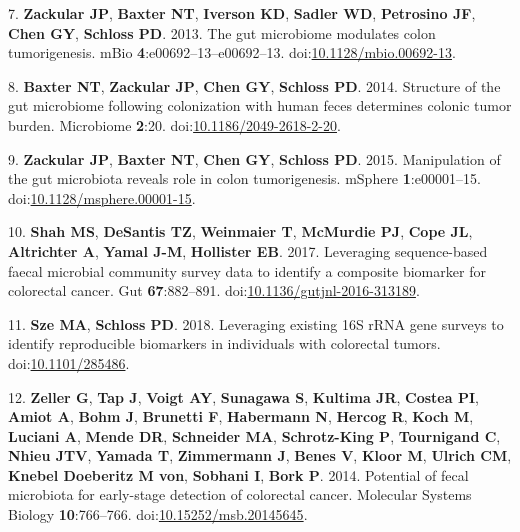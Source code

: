 \documentclass[11pt,]{article}
\begin{document}
\hypertarget{ref-Zackular2013}{}
7. \textbf{Zackular JP}, \textbf{Baxter NT}, \textbf{Iverson KD},
\textbf{Sadler WD}, \textbf{Petrosino JF}, \textbf{Chen GY},
\textbf{Schloss PD}. 2013. The gut microbiome modulates colon
tumorigenesis. mBio \textbf{4}:e00692--13--e00692--13.
doi:\href{https://doi.org/10.1128/mbio.00692-13}{10.1128/mbio.00692-13}.

\hypertarget{ref-Baxter2014}{}
8. \textbf{Baxter NT}, \textbf{Zackular JP}, \textbf{Chen GY},
\textbf{Schloss PD}. 2014. Structure of the gut microbiome following
colonization with human feces determines colonic tumor burden.
Microbiome \textbf{2}:20.
doi:\href{https://doi.org/10.1186/2049-2618-2-20}{10.1186/2049-2618-2-20}.

\hypertarget{ref-Zackular2015}{}
9. \textbf{Zackular JP}, \textbf{Baxter NT}, \textbf{Chen GY},
\textbf{Schloss PD}. 2015. Manipulation of the gut microbiota reveals
role in colon tumorigenesis. mSphere \textbf{1}:e00001--15.
doi:\href{https://doi.org/10.1128/msphere.00001-15}{10.1128/msphere.00001-15}.

\hypertarget{ref-Shah2017}{}
10. \textbf{Shah MS}, \textbf{DeSantis TZ}, \textbf{Weinmaier T},
\textbf{McMurdie PJ}, \textbf{Cope JL}, \textbf{Altrichter A},
\textbf{Yamal J-M}, \textbf{Hollister EB}. 2017. Leveraging
sequence-based faecal microbial community survey data to identify a
composite biomarker for colorectal cancer. Gut \textbf{67}:882--891.
doi:\href{https://doi.org/10.1136/gutjnl-2016-313189}{10.1136/gutjnl-2016-313189}.

\hypertarget{ref-meta_analysis_crc_Sze2018}{}
11. \textbf{Sze MA}, \textbf{Schloss PD}. 2018. Leveraging existing 16S
rRNA gene surveys to identify reproducible biomarkers in individuals
with colorectal tumors.
doi:\href{https://doi.org/10.1101/285486}{10.1101/285486}.

\hypertarget{ref-Zeller2014}{}
12. \textbf{Zeller G}, \textbf{Tap J}, \textbf{Voigt AY},
\textbf{Sunagawa S}, \textbf{Kultima JR}, \textbf{Costea PI},
\textbf{Amiot A}, \textbf{Bohm J}, \textbf{Brunetti F},
\textbf{Habermann N}, \textbf{Hercog R}, \textbf{Koch M},
\textbf{Luciani A}, \textbf{Mende DR}, \textbf{Schneider MA},
\textbf{Schrotz-King P}, \textbf{Tournigand C}, \textbf{Nhieu JTV},
\textbf{Yamada T}, \textbf{Zimmermann J}, \textbf{Benes V},
\textbf{Kloor M}, \textbf{Ulrich CM}, \textbf{Knebel Doeberitz M von},
\textbf{Sobhani I}, \textbf{Bork P}. 2014. Potential of fecal microbiota
for early-stage detection of colorectal cancer. Molecular Systems
Biology \textbf{10}:766--766.
doi:\href{https://doi.org/10.15252/msb.20145645}{10.15252/msb.20145645}.
\end{document}
